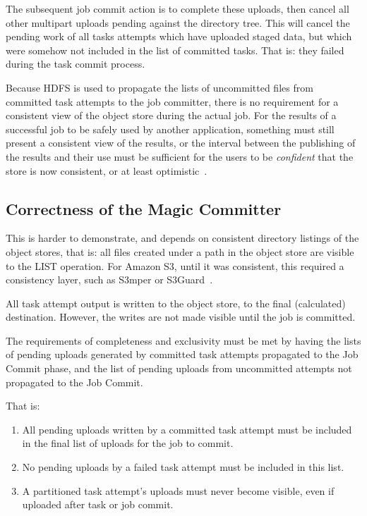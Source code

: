 \documentclass[conference]{IEEEtran}
\begin{document}
The subsequent job commit action is to complete these uploads,
then cancel all other multipart uploads pending against the directory tree.
This will cancel the pending work of all tasks attempts which have uploaded staged
data, but which were somehow not included in the list of committed tasks.
That is: they failed during the task commit process.

Because HDFS is used to propagate the lists of uncommitted files from
committed task attempts to the job committer, there is no requirement for
a consistent view of the object store during the actual job.
For the results of a successful job to be safely used by another application,
something must still present a consistent view of the results, or
the interval between the publishing of the results and their use must be sufficient
for the users to be \emph{confident} that the store is now consistent,
or at least optimistic\ \cite{Bermbach:2014:BEC:2624303.2624662}.



\subsection{Correctness of the Magic Committer}

This is harder to demonstrate, and depends on consistent directory
listings of the object stores, that is: all files created under a path
in the object store are visible to the LIST operation.
For Amazon S3, until it was consistent, this required a consistency layer,
such as S3mper or S3Guard\ \cite{S3mper,HADOOP-13345}.

All task attempt output is written to the object store, to the final (calculated)
destination.
However, the writes are not made visible until the job is committed.

The requirements of completeness and exclusivity must be met by
having the lists of pending uploads generated by committed task attempts propagated
to the Job Commit phase, and the list of pending uploads from uncommitted
attempts not propagated to the Job Commit.

That is:

\begin{enumerate}
  \item All pending uploads written by a committed task attempt must be
  included in the final list of uploads for the job to commit.
  \item No pending uploads by a failed task attempt must be included in this list.
  \item A partitioned task attempt's uploads must never become visible,
  even if uploaded after task or job commit.
\end{enumerate}
\end{document}
